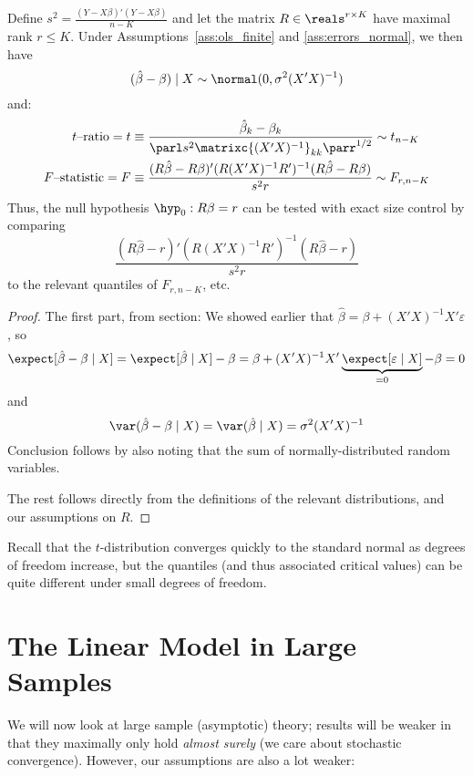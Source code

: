 \documentclass[10pt]{article}
\begin{document}
	\begin{theorem}
		Define $s^2 = \frac{(Y-X\beta)'(Y-X\beta)}{n-K}$ and let the matrix $R \in \reals^{r \times K}$ have maximal rank $r \le K$. Under Assumptions~\ref{ass:ols_finite} and \ref{ass:errors_normal}, we then have \[(\hat{\beta}-\beta) \mid X \sim \normal(0,\sigma^2(X'X)^{-1})\]and:\begin{align*} t\textnormal{--ratio} = t &\equiv \frac{\hat{\beta}_k - \beta_k}{	\parl s^2 \matrixc{(X'X)^{-1}}_{kk}\parr^{1/2}} \sim t_{n-K} \\ F\textnormal{--statistic} = F &\equiv \frac{(R\hat{\beta} - R\beta)' (R(X'X)^{-1}R')^{-1}(R\hat{\beta} - R\beta)}{s^2r} \sim F_{r,n-K} \end{align*}Thus, the null hypothesis $\hyp_0: R\beta = r$ can be tested with exact size control by comparing \[\frac{(R\hat{\beta} - r)' (R(X'X)^{-1}R')^{-1}(R\hat{\beta} - r)}{s^2r}\]to the relevant quantiles of $F_{r,n-K}$, etc.
	\end{theorem}
	\begin{proof}
		The first part, from section: We showed earlier that $\hat{\beta} = \beta + (X'X)^{-1}X'\varepsilon$, so \[\expect[\hat{\beta} - \beta \mid X] = \expect[\hat{\beta} \mid X ] - \beta = \beta + (X'X)^{-1}X' \underbrace{\expect[\varepsilon \mid X] }_{=0} - \beta = 0\]
		and \[\var(\hat{\beta} - \beta \mid X) = \var(\hat{\beta} \mid X) = \sigma^2 (X'X)^{-1}\]Conclusion follows by also noting that the sum of normally-distributed random variables.
		
		The rest follows directly from the definitions of the relevant distributions, and our assumptions on $R$.
	\end{proof}
	
	\begin{remark}
		Recall that the $t$-distribution converges quickly to the standard normal as degrees of freedom increase, but the quantiles (and thus associated critical values) can be quite different under small degrees of freedom.
	\end{remark}

\newpage
\section{The Linear Model in Large Samples}

We will now look at large sample (asymptotic) theory; results will be weaker in that they maximally only hold \emph{almost surely} (\ie we care about stochastic convergence). However, our assumptions are also a lot weaker:
\end{document}
